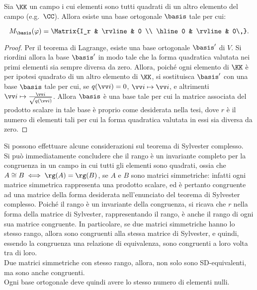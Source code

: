 \documentclass[11pt]{article}
\begin{document}
	\begin{theorem}
		Sia $\KK$ un campo i cui elementi sono tutti quadrati di un
		altro elemento del campo (e.g.~$\CC$). Allora esiste una base
		ortogonale $\basis$ tale per cui:
		
		\[ M_\basis(\varphi) = \Matrix{I_r & \rvline & 0 \\ \hline 0 & \rvline & 0\,}. \]
	\end{theorem}

	\begin{proof}
		Per il teorema di Lagrange, esiste una base ortogonale $\basis'$ di $V$.
		Si riordini allora la base $\basis'$ in modo tale che la forma quadratica valutata nei primi elementi sia sempre diversa da zero. Allora, poiché ogni
		elemento di $\KK$ è per ipotesi quadrato di un altro elemento
		di $\KK$, si sostituisca $\basis'$ con una base $\basis$ tale per
		cui, se $q(\vv i) = 0$, $\vv i \mapsto \vv i$, e altrimenti
		$\vv i \mapsto \frac{\vv i}{\sqrt{q(\vv i)}}$. Allora $\basis$
		è una base tale per cui la matrice associata del prodotto scalare
		in tale base è proprio come desiderata nella tesi, dove $r$ è
		il numero di elementi tali per cui la forma quadratica valutata
		in essi sia diversa da zero.
	\end{proof}

	\begin{remark}
		Si possono effettuare alcune considerazioni sul teorema di Sylvester
		complesso. \\
		
		\li Si può immediatamente concludere che il rango è un invariante
		completo per la congruenza in un campo in cui tutti gli elementi
		sono quadrati, ossia che $A \cong B \iff \rg(A) = \rg(B)$, se $A$ e
		$B$ sono matrici simmetriche: infatti
		ogni matrice simmetrica rappresenta una prodotto scalare, ed è
		pertanto congruente ad una matrice della forma desiderata
		nell'enunciato del teorema di Sylvester complesso. Poiché il rango
		è un invariante della congruenza, si ricava che $r$ nella forma
		della matrice di Sylvester, rappresentando il rango, è anche
		il rango di ogni sua matrice congruente. In particolare, se due
		matrici simmetriche hanno lo stesso rango, allora sono congruenti
		alla stessa matrice di Sylvester, e quindi, essendo la congruenza
		una relazione di equivalenza, sono congruenti a loro volta tra di loro. \\
		\li Due matrici simmetriche con stesso rango, allora, non solo
		sono SD-equivalenti, ma sono anche congruenti. \\
		\li Ogni base ortogonale deve quindi avere lo stesso numero
		di elementi nulli.
	\end{remark}
\end{document}
